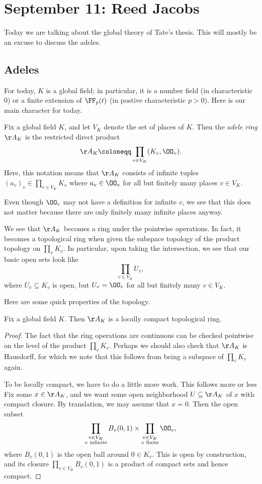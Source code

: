\documentclass{article}
\begin{document}
\section{September 11: Reed Jacobs}
Today we are talking about the global theory of Tate's thesis. This will mostly be an excuse to discuss the adeles.

\subsection{Adeles}
For today, $K$ is a global field; in particular, it is a number field (in characteristic $0$) or a finite extension of $\FF_p(t)$ (in postive characteristic $p>0$). Here is our main character for today.
\begin{definition}
	Fix a global field $K$, and let $V_K$ denote the set of places of $K$. Then the \textit{adele ring $\AA_K$} is the restricted direct product
	\[\AA_K\coloneqq\prod_{v\in V_K}(K_v,\OO_v).\]
	Here, this notation means that $\AA_K$ consists of infinite tuples $(a_v)_v\in\prod_{v\in V_K}K_v$ where $a_v\in \OO_v$ for all but finitely many places $v\in V_K$.
\end{definition}
\begin{remark}
	Even though $\OO_v$ may not have a definition for infinite $v$, we see that this does not matter because there are only finitely many infinite places anyway.
\end{remark}
\begin{remark}
	We see that $\AA_K$ becomes a ring under the pointwise operations. In fact, it becomes a topological ring when given the subspace topology of the product topology on $\prod_vK_v$. In particular, upon taking the intersection, we see that our basic open sets look like
	\[\prod_{v\in V_K}U_v,\]
	where $U_v\subseteq K_v$ is open, but $U_v=\OO_v$ for all but finitely many $v\in V_K$.
\end{remark}
Here are some quick properties of the topology.
\begin{proposition}
	Fix a global field $K$. Then $\AA_K$ is a locally compact topological ring.
\end{proposition}
\begin{proof}
	The fact that the ring operations are continuous can be checked pointwise on the level of the product $\prod_vK_v$. Perhaps we should also check that $\AA_K$ is Hausdorff, for which we note that this follows from being a subspace of $\prod_vK_v$ again.
	
	To be locally compact, we have to do a little more work. This follows more or less  Fix some $x\in\AA_K$, and we want some open neighborhood $U\subseteq\AA_K$ of $x$ with compact closure. By translation, we may assume that $x=0$. Then the open subset
	\[\prod_{\substack{v\in V_K\\v\text{ infinite}}}B_v(0,1)\times\prod_{\substack{v\in V_K\\v\text{ finite}}}\OO_v,\]
	where $B_v(0,1)$ is the open ball around $0\in K_v$. This is open by construction, and its closure $\prod_{v\in V_K}\overline{B_v(0,1)}$ is a product of compact sets and hence compact.
\end{proof}
\end{document}
